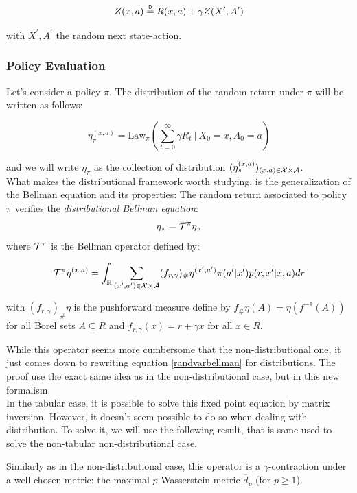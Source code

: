 \begin{equation}\label{randvarbellman}
    Z(x,a) \deq R(x,a) + \gamma Z(X^\prime, A^\prime)
\end{equation}

with $X^\prime, A^\prime$ the random next state-action. 

\subsubsection*{Policy Evaluation}
Let’s consider a policy $\pi$. The distribution of the random return under $\pi$ will be written as follows:

\[ \eta_\pi^{(x,a)} = \text{Law}_\pi \left( \sum_{t = 0}^{\infty} \gamma R_t \ | \ X_0 = x, A_0 = a \right) \]

and we will write $\eta_\pi$ as the collection of distribution $(\eta_\pi^{(x,a)})_{(x,a) \in \mathcal{X} \times \mathcal{A}}$.\\

What makes the distributional framework worth studying, is the generalization of the Bellman equation and its properties:
The random return associated to policy $\pi$ verifies the \emph{distributional Bellman equation}:
\[\eta_\pi = \mathcal{T}^\pi \eta_\pi \]
where $\mathcal{T}^\pi$ is the Bellman operator defined by:

\[
    \mathcal{T}^\pi \eta^{(x,a)} = \int_{\mathbb{R}} \sum_{(x^\prime,a^\prime)\in \mathcal{X} \times \mathcal{A}} (f_{r,\gamma})_\#\eta^{(x^\prime,a^\prime)}\pi(a^\prime|x^\prime)p(r,x^\prime|x,a)dr
\]

with $(f_{r,\gamma})_\#\eta$ is the pushforward measure define by $f_\#\eta(A) = \eta(f^{-1}(A))$ for all Borel sets $A\subseteq R$ and $f_{r,\gamma}(x) = r + \gamma x$ for all $x \in R$.

While this operator seems more cumbersome that the non-distributional one, it just comes down to rewriting equation \ref{randvarbellman} for distributions. The proof use the exact same idea as in the non-distributional case, but in this new formalism. \\

In the tabular case, it is possible to solve this fixed point equation by matrix inversion. However, it doesn’t seem possible to do so when dealing with distribution. To solve it, we will use the following result, that is same used to solve the non-tabular non-distributional case.

Similarly as in the non-distributional case, this operator is a $\gamma$-contraction under a well chosen metric: the maximal $p$-Wasserstein metric $\overline{d}_p$ (for $p \geq 1$).

